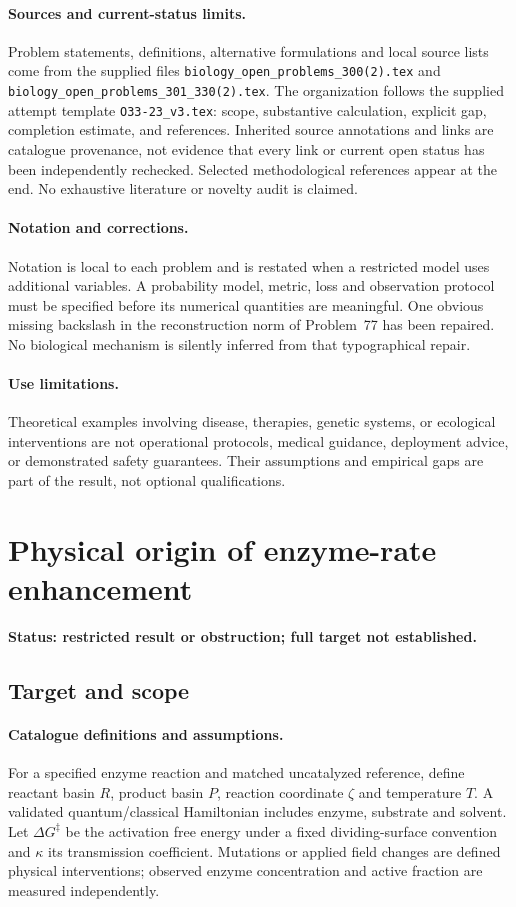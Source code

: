\documentclass[11pt]{article}
\begin{document}
\paragraph{Sources and current-status limits.}
Problem statements, definitions, alternative formulations and local source lists
come from the supplied files
\texttt{biology\_open\_problems\_300(2).tex} and
\texttt{biology\_open\_problems\_301\_330(2).tex}.
The organization follows the supplied attempt template
\texttt{O33-23\_v3.tex}: scope, substantive calculation, explicit gap,
completion estimate, and references. Inherited source annotations and links are
catalogue provenance, not evidence that every link or current open status has
been independently rechecked. Selected methodological references appear at the
end. No exhaustive literature or novelty audit is claimed.

\paragraph{Notation and corrections.}
Notation is local to each problem and is restated when a restricted model uses
additional variables. A probability model, metric, loss and observation protocol
must be specified before its numerical quantities are meaningful. One obvious
missing backslash in the reconstruction norm of Problem~77 has been repaired.
No biological mechanism is silently inferred from that typographical repair.

\paragraph{Use limitations.}
Theoretical examples involving disease, therapies, genetic systems, or ecological
interventions are not operational protocols, medical guidance, deployment advice,
or demonstrated safety guarantees. Their assumptions and empirical gaps are part
of the result, not optional qualifications.


\section*{Physical origin of enzyme-rate enhancement}
\label{prob:093}
\noindent\textbf{Status: restricted result or obstruction; full target not established.}
\subsection{Target and scope}
\paragraph{Catalogue definitions and assumptions.}
For a specified enzyme reaction and matched uncatalyzed reference, define reactant basin $R$, product basin $P$, reaction coordinate $\zeta$ and temperature $T$. A validated quantum/classical Hamiltonian includes enzyme, substrate and solvent. Let $\Delta G^\ddagger$ be the activation free energy under a fixed dividing-surface convention and $\kappa$ its transmission coefficient. Mutations or applied field changes are defined physical interventions; observed enzyme concentration and active fraction are measured independently.
\end{document}
